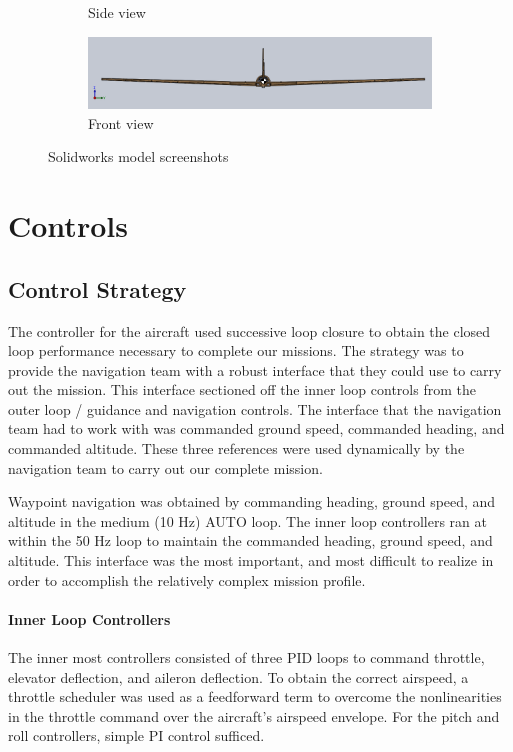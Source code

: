 \documentclass[11pt]{article}
\begin{document}
\begin{figure}[h!]
\begin{subfigure}[b]{0.49\textwidth}
    		\caption{Side view}
    	\end{subfigure}
    	\begin{subfigure}[b]{0.49\textwidth}
    		\includegraphics[width=\textwidth]{Figures/CAD/front.png}
    		\caption{Front view}
        \end{subfigure}%
        \caption{Solidworks model screenshots}\label{fig:SW}
    \end{figure}

\FloatBarrier
\section{Controls}
\label{Controls}
\subsection{Control Strategy}
\label{CtrlStr}

The controller for the aircraft used successive loop closure to obtain the closed loop performance necessary to complete our missions. The strategy was to provide the navigation team with a robust interface that they could use to carry out the mission. This interface sectioned off the inner loop controls from the outer loop / guidance and navigation controls. The interface that the navigation team had to work with was commanded ground speed, commanded heading, and commanded altitude. These three references were used dynamically by the navigation team to carry out our complete mission.

Waypoint navigation was obtained by commanding heading, ground speed, and altitude in the medium (10 Hz) AUTO loop. The inner loop controllers ran at within the 50 Hz loop to maintain the commanded heading, ground speed, and altitude. This interface was the most important, and most difficult to realize in order to accomplish the relatively complex mission profile.

\paragraph{Inner Loop Controllers}
The inner most controllers consisted of three PID loops to command throttle, elevator deflection, and aileron deflection. To obtain the correct airspeed, a throttle scheduler was used as a feedforward term to overcome the nonlinearities in the throttle command over the aircraft's airspeed envelope. For the pitch and roll controllers, simple PI control sufficed.
\end{document}
